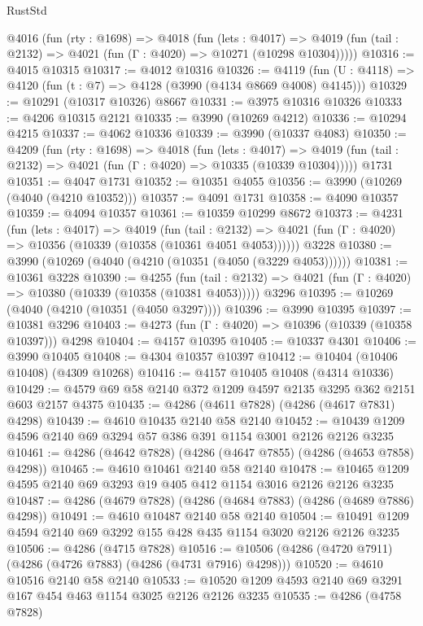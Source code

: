 \begin{lexlean}{RustStd}
\begin{coremodule}
{\begin{coremodule}
{{{{{{{{{{{{{{{{  @4016
    (fun (rty : @1698) =>
    @4018
      (fun (lets : @4017) =>
      @4019 (fun (tail : @2132) => @4021 (fun (Γ : @4020) => @10271 (@10298 @10304)))))
@10316 := @4015 @10315
@10317 := @4012 @10316
@10326 := @4119 (fun (U : @4118) => @4120 (fun (t : @7) => @4128 (@3990 (@4134 @8669 @4008) @4145)))
@10329 := @10291 (@10317 @10326) @8667
@10331 := @3975 @10316 @10326
@10333 := @4206 @10315 @2121
@10335 := @3990 (@10269 @4212)
@10336 := @10294 @4215
@10337 := @4062 @10336
@10339 := @3990 (@10337 @4083)
@10350 := @4209
    (fun (rty : @1698) =>
    @4018
      (fun (lets : @4017) =>
      @4019 (fun (tail : @2132) => @4021 (fun (Γ : @4020) => @10335 (@10339 @10304)))))
    @1731
@10351 := @4047 @1731
@10352 := @10351 @4055
@10356 := @3990 (@10269 (@4040 (@4210 @10352)))
@10357 := @4091 @1731
@10358 := @4090 @10357
@10359 := @4094 @10357
@10361 := @10359 @10299 @8672
@10373 := @4231
    (fun (lets : @4017) =>
    @4019
      (fun (tail : @2132) =>
      @4021 (fun (Γ : @4020) => @10356 (@10339 (@10358 (@10361 @4051 @4053))))))
    @3228
@10380 := @3990 (@10269 (@4040 (@4210 (@10351 (@4050 (@3229 @4053))))))
@10381 := @10361 @3228
@10390 := @4255
    (fun (tail : @2132) => @4021 (fun (Γ : @4020) => @10380 (@10339 (@10358 (@10381 @4053)))))
    @3296
@10395 := @10269 (@4040 (@4210 (@10351 (@4050 @3297))))
@10396 := @3990 @10395
@10397 := @10381 @3296
@10403 := @4273 (fun (Γ : @4020) => @10396 (@10339 (@10358 @10397))) @4298
@10404 := @4157 @10395
@10405 := @10337 @4301
@10406 := @3990 @10405
@10408 := @4304 @10357 @10397
@10412 := @10404 (@10406 @10408) (@4309 @10268)
@10416 := @4157 @10405 @10408 (@4314 @10336)
@10429 := @4579 @69 @58 @2140 @372 @1209 @4597 @2135 @3295 @362 @2151 @603 @2157 @4375
@10435 := @4286 (@4611 @7828) (@4286 (@4617 @7831) @4298)
@10439 := @4610 @10435 @2140 @58 @2140
@10452 := @10439 @1209 @4596 @2140 @69 @3294 @57 @386 @391 @1154 @3001 @2126 @2126 @3235
@10461 := @4286 (@4642 @7828) (@4286 (@4647 @7855) (@4286 (@4653 @7858) @4298))
@10465 := @4610 @10461 @2140 @58 @2140
@10478 := @10465 @1209 @4595 @2140 @69 @3293 @19 @405 @412 @1154 @3016 @2126 @2126 @3235
@10487 := @4286 (@4679 @7828) (@4286 (@4684 @7883) (@4286 (@4689 @7886) @4298))
@10491 := @4610 @10487 @2140 @58 @2140
@10504 := @10491 @1209 @4594 @2140 @69 @3292 @155 @428 @435 @1154 @3020 @2126 @2126 @3235
@10506 := @4286 (@4715 @7828)
@10516 := @10506 (@4286 (@4720 @7911) (@4286 (@4726 @7883) (@4286 (@4731 @7916) @4298)))
@10520 := @4610 @10516 @2140 @58 @2140
@10533 := @10520 @1209 @4593 @2140 @69 @3291 @167 @454 @463 @1154 @3025 @2126 @2126 @3235
@10535 := @4286 (@4758 @7828)
}}}}}}}}}}}}}}}}
\end{coremodule}}
\end{coremodule}
\end{lexlean}
